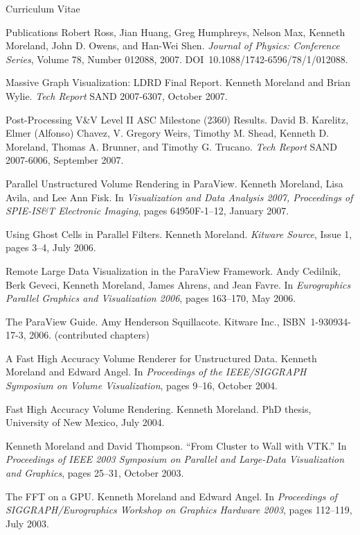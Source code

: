 \documentclass{article}
\begin{document}
\begin{cv}{Curriculum Vitae}
\begin{cvlist}{Publications}
      Robert Ross, Jian Huang, Greg Humphreys, Nelson Max, Kenneth
      Moreland, John D. Owens, and Han-Wei Shen. \emph{Journal of Physics:
        Conference Series}, Volume 78, Number 012088,
      2007. DOI~10.1088/1742-6596/78/1/012088.
    \item[Massive Graph Visualization: LDRD Final Report.] Kenneth Moreland
      and Brian Wylie.  \emph{Tech Report} SAND 2007-6307, October 2007.
    \item[Post-Processing V\&V Level II ASC Milestone (2360) Results.]
      David B. Karelitz, Elmer (Alfonso) Chavez, V. Gregory Weirs, Timothy
      M. Shead, Kenneth D. Moreland, Thomas A. Brunner, and Timothy
      G. Trucano.  \emph{Tech Report} SAND 2007-6006, September 2007.
    \item[Parallel Unstructured Volume Rendering in ParaView.] Kenneth
      Moreland, Lisa Avila, and Lee Ann Fisk.  In \emph{Visualization and
        Data Analysis 2007, Proceedings of SPIE-IS\&T Electronic Imaging},
      pages 64950F-1--12, January 2007.
    \item[Using Ghost Cells in Parallel Filters.] Kenneth Moreland.
      \emph{Kitware Source}, Issue 1, pages 3--4, July 2006.
    \item[Remote Large Data Visualization in the ParaView Framework.] Andy
      Cedilnik, Berk Geveci, Kenneth Moreland, James Ahrens, and Jean
      Favre.  In \emph{Eurographics Parallel Graphics and Visualization
        2006}, pages 163--170, May 2006.
    \item[The ParaView Guide.] Amy Henderson Squillacote.  Kitware
      Inc., ISBN~1-930934-17-3, 2006. (contributed chapters)
    \item[A Fast High Accuracy Volume Renderer for Unstructured Data.]
      Kenneth Moreland and Edward Angel.  In \emph{Proceedings of the
        IEEE/SIGGRAPH Symposium on Volume Visualization}, pages 9--16,
      October 2004.
    \item[Fast High Accuracy Volume Rendering.] Kenneth Moreland.  PhD
      thesis, University of New Mexico, July 2004.
    \item Kenneth Moreland and David Thompson.  ``From Cluster to Wall
      with VTK.''  In \emph{Proceedings of IEEE 2003 Symposium on
      Parallel and Large-Data Visualization and Graphics}, pages 25--31,
      October 2003.
    \item[The FFT on a GPU.] Kenneth Moreland and Edward Angel.  In
      \emph{Proceedings of SIGGRAPH/Eurographics Workshop on Graphics
        Hardware 2003}, pages 112--119, July 2003.

\end{cvlist}
\end{cv}
\end{document}
